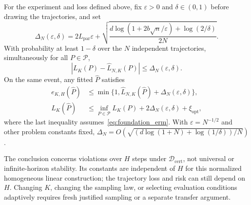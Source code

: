 \begin{theorem}
\label{thm:foundation_generalization}
For the experiment and loss defined above, fix
$\varepsilon>0$ and $\delta\in(0,1)$ before drawing the trajectories, and set
\begin{equation}
\label{eq:foundation_generalization_penalty}
 \Delta_N(\varepsilon,\delta)
 =2L_{\mathrm{par}}\varepsilon+
 \sqrt{\frac{d\log(1+2b\sqrt n/\varepsilon)+\log(2/\delta)}{2N}}.
\end{equation}
With probability at least $1-\delta$ over the $N$ independent trajectories,
simultaneously for all $P\in\mathcal P$,
\begin{equation}
\label{eq:foundation_uniform_bound}
 |L_K(P)-\widehat L_{N,K}(P)|\le\Delta_N(\varepsilon,\delta).
\end{equation}
On the same event, any fitted $\widehat P$ satisfies
\begin{align}
\label{eq:foundation_fitted_risk}
 e_{K,H}(\widehat P)
 &\le\min\{1,\widehat L_{N,K}(\widehat P)+\Delta_N(\varepsilon,\delta)\},\\
\label{eq:foundation_erm_population}
 L_K(\widehat P)
 &\le\inf_{P\in\mathcal P}L_K(P)
        +2\Delta_N(\varepsilon,\delta)+\xi_{\mathrm{opt}},
\end{align}
where the last inequality assumes~\eqref{eq:foundation_erm}.
With $\varepsilon=N^{-1/2}$ and other problem constants fixed,
$\Delta_N=O(\sqrt{(d\log(1+N)+\log(1/\delta))/N})$.
\end{theorem}

The conclusion concerns violations over $H$ steps under
$\mathcal D_{\mathrm{cert}}$, not universal or infinite-horizon stability.
Its constants are independent of $H$ for this normalized homogeneous linear
construction; the trajectory loss and risk can still depend on $H$.
Changing $K$, changing the sampling law, or selecting evaluation conditions
adaptively requires fresh justified sampling or a separate transfer argument.

